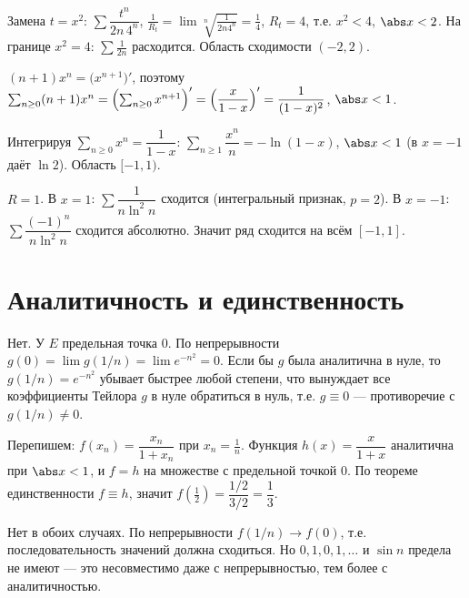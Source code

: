 \sol Замена $t=x^2$: $\sum\dfrac{t^n}{2n\,4^n}$, $\tfrac1{R_t}=\lim\sqrt[n]{\tfrac1{2n4^n}}=\tfrac14$,
$R_t=4$, т.е. $x^2<4$, $\abs x<2$. На границе $x^2=4$: $\sum\tfrac1{2n}$ расходится. Область
сходимости $(-2,2)$.

\sol $(n+1)x^n=\bigl(x^{n+1}\bigr)'$, поэтому
$\sum_{n\ge0}(n+1)x^n=\Bigl(\sum_{n\ge0}x^{n+1}\Bigr)'=\Bigl(\dfrac{x}{1-x}\Bigr)'=\dfrac1{(1-x)^2}$,
$\abs x<1$.

\sol Интегрируя $\sum_{n\ge0}x^n=\dfrac1{1-x}$: $\sum_{n\ge1}\dfrac{x^n}{n}=-\ln(1-x)$, $\abs x<1$
(в $x=-1$ даёт $\ln2$). Область $[-1,1)$.

\sol $R=1$. В $x=1$: $\sum\dfrac1{n\ln^2n}$ сходится (интегральный признак, $p=2$). В $x=-1$:
$\sum\dfrac{(-1)^n}{n\ln^2n}$ сходится абсолютно. Значит ряд сходится на всём $[-1,1]$.

\section{Аналитичность и единственность}

\sol Нет. У $E$ предельная точка $0$. По непрерывности $g(0)=\lim g(1/n)=\lim e^{-n^2}=0$. Если бы
$g$ была аналитична в нуле, то $g(1/n)=e^{-n^2}$ убывает быстрее любой степени, что вынуждает все
коэффициенты Тейлора $g$ в нуле обратиться в нуль, т.е. $g\equiv0$ — противоречие с $g(1/n)\ne0$.

\sol Перепишем: $f(x_n)=\dfrac{x_n}{1+x_n}$ при $x_n=\tfrac1n$. Функция $h(x)=\dfrac{x}{1+x}$
аналитична при $\abs x<1$, и $f=h$ на множестве с предельной точкой $0$. По теореме единственности
$f\equiv h$, значит $f(\tfrac12)=\dfrac{1/2}{3/2}=\dfrac13$.

\sol Нет в обоих случаях. По непрерывности $f(1/n)\to f(0)$, т.е. последовательность значений должна
сходиться. Но $0,1,0,1,\dots$ и $\sin n$ предела не имеют — это несовместимо даже с непрерывностью,
тем более с аналитичностью.


